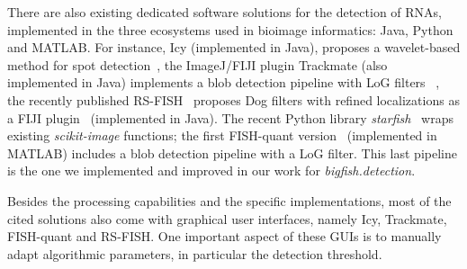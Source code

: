 There are also existing dedicated software solutions for the detection of RNAs, implemented in the three ecosystems used in bioimage informatics: Java, Python and MATLAB. For instance, Icy (implemented in Java), proposes a wavelet-based method for spot detection~\cite{de_chaumont_icy_2012}, the ImageJ/FIJI plugin Trackmate (also implemented in Java) implements a blob detection pipeline with \ac{LoG} filters ~\cite{ershov_trackmate_2022}, the recently published RS-FISH~\cite{bahry_rs-fish_2021} proposes \ac{Dog} filters with refined localizations as a FIJI plugin~\cite{schindelin_fiji_2012} (implemented in Java). 
The recent Python library \emph{starfish}~\cite{perkel_starfish_2019} wraps existing \emph{scikit-image} functions;  the first FISH-quant version~\cite{mueller_fish-quant_2013} (implemented in MATLAB) includes a blob detection pipeline with a \ac{LoG} filter. This last pipeline is the one we implemented and improved in our work for \emph{bigfish.detection}.


Besides the processing capabilities and the specific implementations, most of the cited solutions also come with graphical user interfaces, namely Icy, Trackmate, FISH-quant and RS-FISH. One important aspect of these GUIs is to manually adapt algorithmic parameters, in particular the detection threshold. 


